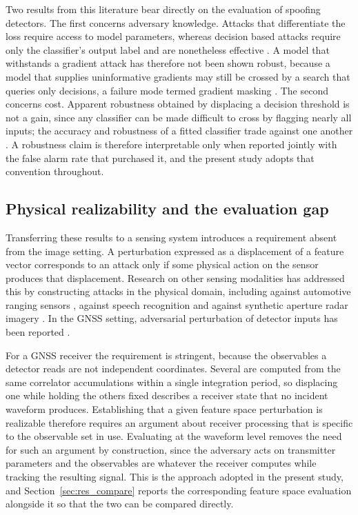 \documentclass[pdflatex,sn-basic]{sn-jnl}
\theoremstyle{thmstyleone}
\theoremstyle{thmstyletwo}
\theoremstyle{thmstylethree}
\begin{document}
Two results from this literature bear directly on the evaluation of spoofing detectors.
The first concerns adversary knowledge. Attacks that differentiate the loss require access
to model parameters, whereas decision based attacks require only the classifier's output
label and are nonetheless effective \citep{brendel2018decision,chen2020hopskipjump}. A
model that withstands a gradient attack has therefore not been shown robust, because a
model that supplies uninformative gradients may still be crossed by a search that queries
only decisions, a failure mode termed gradient masking \citep{athalye2018obfuscated}. The
second concerns cost. Apparent robustness obtained by displacing a decision threshold is
not a gain, since any classifier can be made difficult to cross by flagging nearly all
inputs; the accuracy and robustness of a fitted classifier trade against one another
\citep{tsipras2019robustness}. A robustness claim is therefore interpretable only when
reported jointly with the false alarm rate that purchased it, and the present study adopts
that convention throughout.

\subsection{Physical realizability and the evaluation gap}
\label{sec:rw_physical}

Transferring these results to a sensing system introduces a requirement absent from the
image setting. A perturbation expressed as a displacement of a feature vector corresponds
to an attack only if some physical action on the sensor produces that displacement.
Research on other sensing modalities has addressed this by constructing attacks in the
physical domain, including against automotive ranging sensors
\citep{petit2015remote,cao2021invisible}, against speech recognition
\citep{carlini2018audio} and against synthetic aperture radar imagery \citep{lin2023sar}.
In the GNSS setting, adversarial perturbation of detector inputs has been reported
\citep{an2025adversarial}.

For a GNSS receiver the requirement is stringent, because the observables a detector reads
are not independent coordinates. Several are computed from the same correlator
accumulations within a single integration period, so displacing one while holding the
others fixed describes a receiver state that no incident waveform produces. Establishing
that a given feature space perturbation is realizable therefore requires an argument about
receiver processing that is specific to the observable set in use. Evaluating at the
waveform level removes the need for such an argument by construction, since the adversary
acts on transmitter parameters and the observables are whatever the receiver computes while
tracking the resulting signal. This is the approach adopted in the present study, and
Section~\ref{sec:res_compare} reports the corresponding feature space evaluation alongside
it so that the two can be compared directly.
\end{document}
